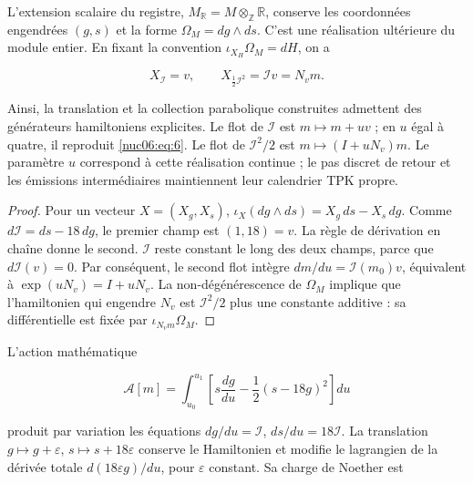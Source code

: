 \begin{theorem}
\label{nuc06:variacional}

L’extension scalaire du registre, \(M_{\mathbb R}=M\otimes_{\mathbb Z}\mathbb R\), conserve les coordonnées engendrées \((g,s)\) et la forme \(\Omega_M=dg\wedge ds\). C’est une réalisation ultérieure du module entier. En fixant la convention \(\iota_{X_H}\Omega_M=dH\), on a


\begin{equation}
X_{\mathcal I}=v,\qquad
X_{\frac12\mathcal I^2}=\mathcal I v=N_vm.
\label{nuc06:eq:12a}
\end{equation}

Ainsi, la translation et la collection parabolique construites admettent des générateurs hamiltoniens explicites. Le flot de \(\mathcal I\) est \(m\mapsto m+uv\) ; en \(u\) égal à quatre, il reproduit \eqref{nuc06:eq:6}. Le flot de \(\mathcal I^2/2\) est \(m\mapsto(I+uN_v)m\). Le paramètre \(u\) correspond à cette réalisation continue ; le pas discret de retour et les émissions intermédiaires maintiennent leur calendrier TPK propre.
\end{theorem}

\begin{proof}
Pour un vecteur \(X=(X_g,X_s)\), \(\iota_X(dg\wedge ds)=X_g\,ds-X_s\,dg\). Comme \(d\mathcal I=ds-18\,dg\), le premier champ est \((1,18)=v\). La règle de dérivation en chaîne donne le second. \(\mathcal I\) reste constant le long des deux champs, parce que \(d\mathcal I(v)=0\). Par conséquent, le second flot intègre \(dm/du=\mathcal I(m_0)v\), équivalent à \(\exp(uN_v)=I+uN_v\). La non-dégénérescence de \(\Omega_M\) implique que l’hamiltonien qui engendre \(N_v\) est \(\mathcal I^2/2\) plus une constante additive : sa différentielle est fixée par \(\iota_{N_vm}\Omega_M\).

\end{proof}

L’action mathématique

\begin{equation}
\mathscr A[m]=\int_{u_0}^{u_1}
\left[s\frac{dg}{du}-\frac12(s-18g)^2\right]du
\label{nuc06:eq:12b}
\end{equation}

produit par variation les équations \(dg/du=\mathcal I\), \(ds/du=18\mathcal I\). La translation \(g\mapsto g+\varepsilon\), \(s\mapsto s+18\varepsilon\) conserve le Hamiltonien et modifie le lagrangien de la dérivée totale \(d(18\varepsilon g)/du\), pour \(\varepsilon\) constant. Sa charge de Noether est

